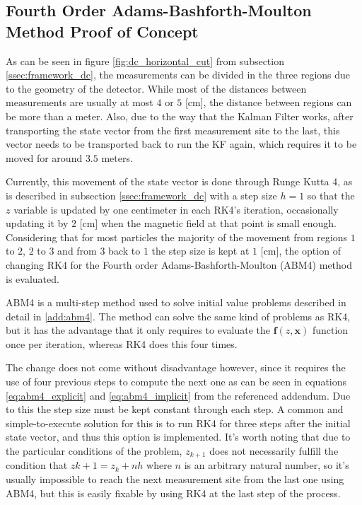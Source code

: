 \subsection{Fourth Order Adams-Bashforth-Moulton Method Proof of Concept} \label{ssec:prop_abm}
As can be seen in figure \ref{fig:dc_horizontal_cut} from subsection \ref{ssec:framework_dc}, the measurements can be divided in the three regions due to the geometry of the detector.
While most of the distances between measurements are usually at most $4$ or $5$ [cm], the distance between regions can be more than a meter.
Also, due to the way that the Kalman Filter works, after transporting the state vector from the first measurement site to the last, this vector needs to be transported back to run the KF again, which requires it to be moved for around $3.5$ meters.

Currently, this movement of the state vector is done through Runge Kutta 4, as is described in subsection \ref{ssec:framework_dc} with a step size $h=1$ so that the $z$ variable is updated by one centimeter in each RK4's iteration, occasionally updating it by $2$ [cm] when the magnetic field at that point is small enough.
Considering that for most particles the majority of the movement from regions $1$ to $2$, $2$ to $3$ and from $3$ back to $1$ the step size is kept at $1$ [cm], the option of changing RK4 for the Fourth order Adams-Bashforth-Moulton (ABM4) method is evaluated.

ABM4 is a multi-step method used to solve initial value problems described in detail in \ref{add:abm4}.
The method can solve the same kind of problems as RK4, but it has the advantage that it only requires to evaluate the $\mathbf{f}(z,\mathbf{x})$ function once per iteration, whereas RK4 does this four times.

The change does not come without disadvantage however, since it requires the use of four previous steps to compute the next one as can be seen in equations \eqref{eq:abm4_explicit} and \eqref{eq:abm4_implicit} from the referenced addendum.
Due to this the step size must be kept constant through each step.
A common and simple-to-execute solution for this is to run RK4 for three steps after the initial state vector, and thus this option is implemented.
It's worth noting that due to the particular conditions of the problem, $z_{k+1}$ does not necessarily fulfill the condition that $z{k+1} = z_k + n h$ where $n$ is an arbitrary natural number, so it's usually impossible to reach the next measurement site from the last one using ABM4, but this is easily fixable by using RK4 at the last step of the process.

